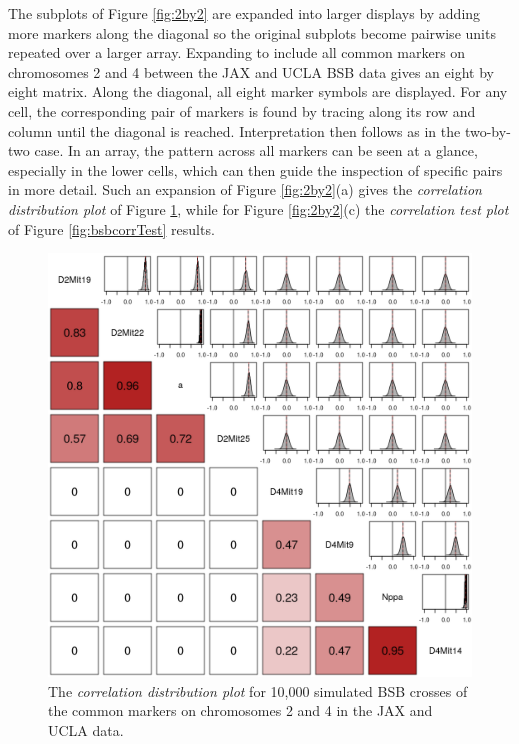 \documentclass[sts]{imsart}
\begin{document}
The subplots of Figure \ref{fig:2by2} are expanded into larger displays by adding more markers along the diagonal so the original subplots become pairwise units repeated over a larger array. Expanding to include all common markers on chromosomes 2 and 4 between the JAX and UCLA BSB data gives an eight by eight matrix. Along the diagonal, all eight marker symbols are displayed. For any cell, the corresponding pair of markers is found by tracing along its row and column until the diagonal is reached. Interpretation then follows as in the two-by-two case. In an array, the pattern across all markers can be seen at a glance, especially in the lower cells, which can then guide the inspection of specific pairs in more detail. Such an expansion of Figure \ref{fig:2by2}(a) gives the \emph{correlation distribution plot} of Figure \ref{fig:bsbcorrDist}, while for Figure \ref{fig:2by2}(c) the \emph{correlation test plot} of Figure \ref{fig:bsbcorrTest} results.

\begin{figure}[t]
  \begin{center}
      \includegraphics[scale = 0.5]{../img/bsbCorrDist.png}
  \end{center}
  \caption{The \emph{correlation distribution plot} for 10,000 simulated BSB crosses of the common markers on chromosomes 2 and 4 in the JAX and UCLA data.}
  \label{fig:bsbcorrDist}
\end{figure}
\end{document}
